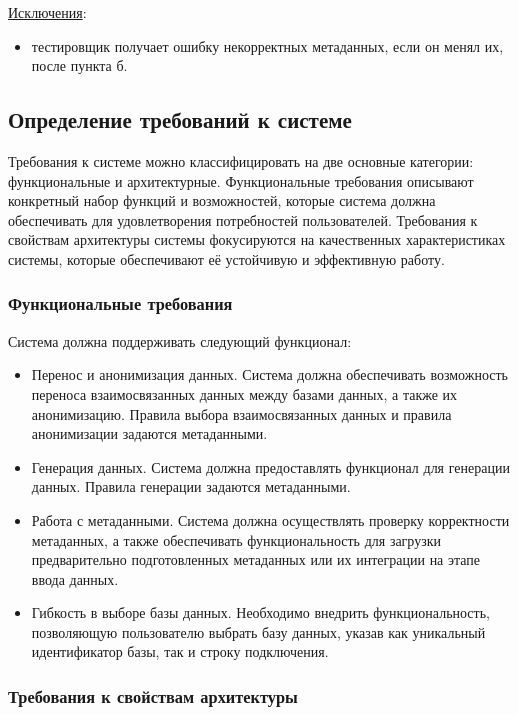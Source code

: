 \underline{Исключения}:

\begin{itemize}
    \item тестировщик получает ошибку некорректных метаданных, если он менял их, после пункта б.
\end{itemize}


\subsection{Определение требований к системе}

Требования к системе можно классифицировать на две основные категории: функциональные и архитектурные. Функциональные требования описывают конкретный набор функций и возможностей, которые система должна обеспечивать для удовлетворения потребностей пользователей. Требования к свойствам архитектуры системы фокусируются на качественных характеристиках системы, которые обеспечивают её устойчивую и эффективную работу.

\subsubsection{Функциональные требования}

Система должна поддерживать следующий функционал:

\begin{itemize}
    \item Перенос и анонимизация данных. Система должна обеспечивать возможность переноса взаимосвязанных данных между базами данных, а также их анонимизацию. Правила выбора взаимосвязанных данных и правила анонимизации задаются метаданными.
    \item Генерация данных. Система должна предоставлять функционал для генерации данных. Правила генерации задаются метаданными.
    \item Работа с метаданными. Система должна осуществлять проверку корректности метаданных, а также обеспечивать функциональность для загрузки предварительно подготовленных метаданных или их интеграции на этапе ввода данных.
    \item Гибкость в выборе базы данных. Необходимо внедрить функциональность, позволяющую пользователю выбрать базу данных, указав как уникальный идентификатор базы, так и строку подключения.
\end{itemize}

\subsubsection{Требования к свойствам архитектуры}

